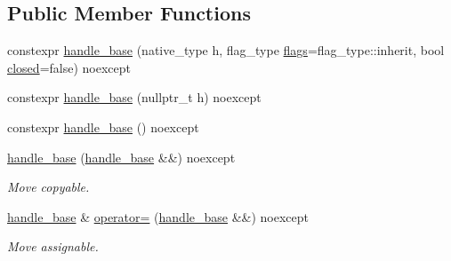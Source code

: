 \subsection*{Public Member Functions}
\begin{DoxyCompactItemize}
\item 
constexpr \mbox{\hyperlink{classdistant_1_1detail_1_1handle__base_a9f2003ece2e3183973e4fc9d7e6c99a7}{handle\+\_\+base}} (native\+\_\+type h, flag\+\_\+type \mbox{\hyperlink{classdistant_1_1detail_1_1handle__base_adc97dc91543d76d0b89f43fee5f5f26b}{flags}}=flag\+\_\+type\+::inherit, bool \mbox{\hyperlink{classdistant_1_1detail_1_1handle__base_abd5ad44b32fda79418c5faada682336a}{closed}}=false) noexcept
\item 
constexpr \mbox{\hyperlink{classdistant_1_1detail_1_1handle__base_a1a7acece6f6efdf438c2e5092451c8ec}{handle\+\_\+base}} (nullptr\+\_\+t h) noexcept
\item 
constexpr \mbox{\hyperlink{classdistant_1_1detail_1_1handle__base_aab5ad3c3cd411c27b87da8187ea51447}{handle\+\_\+base}} () noexcept
\item 
\mbox{\label{classdistant_1_1detail_1_1handle__base_a7afbb166fe281e513aa0933a49eca638}} 
\mbox{\hyperlink{classdistant_1_1detail_1_1handle__base_a7afbb166fe281e513aa0933a49eca638}{handle\+\_\+base}} (\mbox{\hyperlink{classdistant_1_1detail_1_1handle__base}{handle\+\_\+base}} \&\&) noexcept
\begin{DoxyCompactList}\small\item\em Move copyable. \end{DoxyCompactList}\item 
\mbox{\label{classdistant_1_1detail_1_1handle__base_a2890bf2bab82df625da8a945e9be72df}} 
\mbox{\hyperlink{classdistant_1_1detail_1_1handle__base}{handle\+\_\+base}} \& \mbox{\hyperlink{classdistant_1_1detail_1_1handle__base_a2890bf2bab82df625da8a945e9be72df}{operator=}} (\mbox{\hyperlink{classdistant_1_1detail_1_1handle__base}{handle\+\_\+base}} \&\&) noexcept
\begin{DoxyCompactList}\small\item\em Move assignable. \end{DoxyCompactList}\item 
\mbox{\label{classdistant_1_1detail_1_1handle__base_ab7edeab674b5dee8f330ea8b210f4e01}} 

\end{DoxyCompactItemize}
